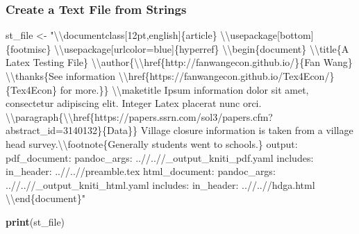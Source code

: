 \documentclass[
]{book}
\newenvironment{Shaded}{\begin{snugshade}}{\end{snugshade}}
\newcommand{\CharTok}[1]{\textcolor[rgb]{0.31,0.60,0.02}{#1}}
\newcommand{\KeywordTok}[1]{\textcolor[rgb]{0.13,0.29,0.53}{\textbf{#1}}}
\newcommand{\NormalTok}[1]{#1}
\newcommand{\StringTok}[1]{\textcolor[rgb]{0.31,0.60,0.02}{#1}}
\begin{document}
\hypertarget{create-a-text-file-from-strings}{%
\subsubsection{Create a Text File from Strings}\label{create-a-text-file-from-strings}}

\begin{Shaded}
\begin{Highlighting}[]
\NormalTok{st\_file \textless{}{-}}\StringTok{ "}\CharTok{\textbackslash{}\textbackslash{}}\StringTok{documentclass[12pt,english]\{article\}}
\CharTok{\textbackslash{}\textbackslash{}}\StringTok{usepackage[bottom]\{footmisc\}}
\CharTok{\textbackslash{}\textbackslash{}}\StringTok{usepackage[urlcolor=blue]\{hyperref\}}
\CharTok{\textbackslash{}\textbackslash{}}\StringTok{begin\{document\}}
\CharTok{\textbackslash{}\textbackslash{}}\StringTok{title\{A Latex Testing File\}}
\CharTok{\textbackslash{}\textbackslash{}}\StringTok{author\{}\CharTok{\textbackslash{}\textbackslash{}}\StringTok{href\{http://fanwangecon.github.io/\}\{Fan Wang\} }\CharTok{\textbackslash{}\textbackslash{}}\StringTok{thanks\{See information }\CharTok{\textbackslash{}\textbackslash{}}\StringTok{href\{https://fanwangecon.github.io/Tex4Econ/\}\{Tex4Econ\} for more.\}\}}
\CharTok{\textbackslash{}\textbackslash{}}\StringTok{maketitle}
\StringTok{Ipsum information dolor sit amet, consectetur adipiscing elit. Integer Latex placerat nunc orci.}
\CharTok{\textbackslash{}\textbackslash{}}\StringTok{paragraph\{}\CharTok{\textbackslash{}\textbackslash{}}\StringTok{href\{https://papers.ssrn.com/sol3/papers.cfm?abstract\_id=3140132\}\{Data\}\}}
\StringTok{Village closure information is taken from a village head survey.}\CharTok{\textbackslash{}\textbackslash{}}\StringTok{footnote\{Generally students went to schools.\}}
\StringTok{output:}
\StringTok{  pdf\_document:}
\StringTok{    pandoc\_args: \textquotesingle{}..//..//\_output\_kniti\_pdf.yaml\textquotesingle{}}
\StringTok{    includes:}
\StringTok{      in\_header: \textquotesingle{}..//..//preamble.tex\textquotesingle{}}
\StringTok{  html\_document:}
\StringTok{    pandoc\_args: \textquotesingle{}..//..//\_output\_kniti\_html.yaml\textquotesingle{}}
\StringTok{    includes:}
\StringTok{      in\_header: \textquotesingle{}..//..//hdga.html\textquotesingle{}}
\CharTok{\textbackslash{}\textbackslash{}}\StringTok{end\{document\}"}

\KeywordTok{print}\NormalTok{(st\_file)}
\end{Highlighting}
\end{Shaded}
\end{document}
